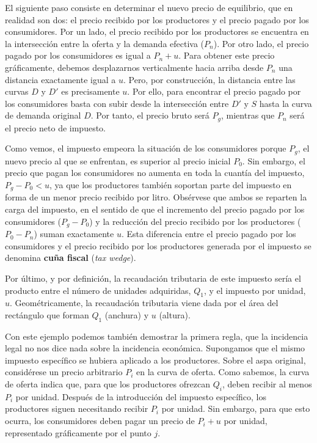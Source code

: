 \documentclass[10pt,a4paper]{article}
\begin{document}
El siguiente paso consiste en determinar el nuevo precio de equilibrio, que en realidad son dos: el precio recibido por los productores y el precio pagado por los consumidores. Por un lado, el precio recibido por los productores se encuentra en la intersección entre la oferta y la demanda efectiva ($P_n$). Por otro lado, el precio pagado por los consumidores es igual a $P_n+u$. Para obtener este precio gráficamente, debemos desplazarnos verticalmente hacia arriba desde $P_n$ una distancia exactamente igual a $u$. Pero, por construcción, la distancia entre las curvas $D$ y $D'$ es precisamente $u$. Por ello, para encontrar el precio pagado por los consumidores basta con subir desde la intersección entre $D'$ y $S$ hasta la curva de demanda original $D$. Por tanto, el precio bruto será $P_g$, mientras que $P_n$ será el precio neto de impuesto. 

Como vemos, el impuesto empeora la situación de los consumidores porque $P_g$, el nuevo precio al que se enfrentan, es superior al precio inicial $P_0$. Sin embargo, el precio que pagan los consumidores no aumenta en toda la cuantía del impuesto, $P_g-P_0 < u$, ya que los productores también soportan parte del impuesto en forma de un menor precio recibido por litro. Obsérvese que ambos se reparten la carga del impuesto, en el sentido de que el incremento del precio pagado por los consumidores ($P_g-P_0$) y la reducción del precio recibido por los productores ($P_0-P_n$) suman exactamente $u$. Esta diferencia entre el precio pagado por los consumidores y el precio recibido por los productores generada por el impuesto se denomina \textbf{cuña fiscal} (\textit{tax wedge}).

Por último, y por definición, la recaudación tributaria de este impuesto sería el producto entre el número de unidades adquiridas, $Q_1$, y el impuesto por unidad, $u$. Geométricamente, la recaudación tributaria viene dada por el área del rectángulo que forman $Q_1$ (anchura) y $u$ (altura).

Con este ejemplo podemos también demostrar la primera regla, que la incidencia legal no nos dice nada sobre la incidencia económica. Supongamos que el mismo impuesto específico se hubiera aplicado a los productores. Sobre el aspa original, considérese un precio arbitrario $P_i$ en la curva de oferta. Como sabemos, la curva de oferta indica que, para que los productores ofrezcan $Q_i$, deben recibir al menos $P_i$ por unidad. Después de la introducción del impuesto específico, los productores siguen necesitando recibir $P_i$ por unidad. Sin embargo, para que esto ocurra, los consumidores deben pagar un precio de $P_i + u$ por unidad, representado gráficamente por el punto $j$.
\end{document}
